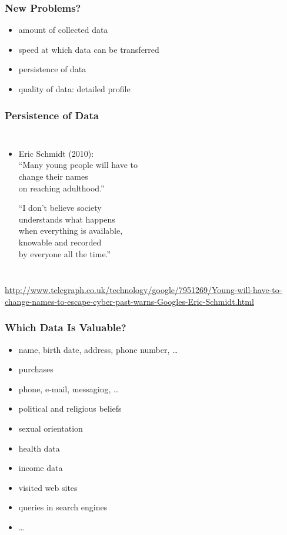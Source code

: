 \documentclass[dvipsnames]{beamer}
\theoremstyle{plain}
\begin{document}
\begin{frame}
  \frametitle{New Problems?}

  \begin{itemize}
    \item amount of collected data
    \item speed at which data can be transferred
    \item persistence of data
    \item quality of data: detailed profile
  \end{itemize}
\end{frame}

\begin{frame}
  \frametitle{Persistence of Data}

  \begin{columns}

    \begin{itemize}
      \item Eric Schmidt (2010):\\
        \smallskip
        ``Many young people will have to\\
        change their names\\
        on reaching adulthood.''

        \medskip
        ``I don't believe society\\
        understands what happens\\
        when everything is available,\\
        knowable and recorded\\
        by everyone all the time.''
    \end{itemize}
  \end{columns}

  \medskip
  \tiny{\url{http://www.telegraph.co.uk/technology/google/7951269/Young-will-have-to-change-names-to-escape-cyber-past-warns-Googles-Eric-Schmidt.html}}\\
\end{frame}

\begin{frame}
  \frametitle{Which Data Is Valuable?}

  \begin{itemize}
    \item name, birth date, address, phone number, \ldots
    \item purchases
    \item phone, e-mail, messaging, \ldots
    \item political and religious beliefs
    \item sexual orientation
    \item health data
    \item income data
    \item visited web sites
    \item queries in search engines
    \item \ldots
  \end{itemize}
\end{frame}
\end{document}
